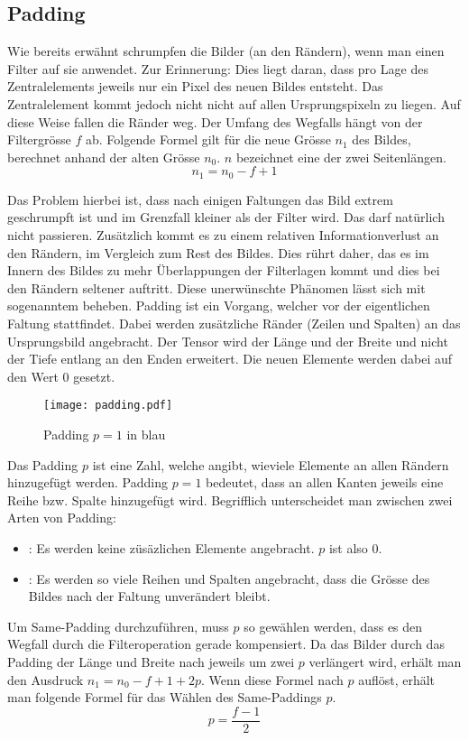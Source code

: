 \subsection{Padding}
Wie bereits erwähnt schrumpfen die Bilder (an den Rändern), wenn man einen Filter auf sie anwendet.
Zur Erinnerung: Dies liegt daran, dass pro Lage des Zentralelements jeweils nur ein Pixel
des neuen Bildes entsteht. Das Zentralelement kommt jedoch nicht nicht auf allen
Ursprungspixeln zu liegen. Auf diese Weise fallen die Ränder weg. Der Umfang des
Wegfalls hängt von der Filtergrösse $f$ ab. Folgende Formel gilt für die
neue Grösse $n_1$ des Bildes, berechnet anhand der alten Grösse $n_0$. $n$ bezeichnet
eine der zwei Seitenlängen.
\begin{equation}
  n_1 = n_0 - f + 1
\end{equation}

Das Problem hierbei ist, dass nach einigen Faltungen das Bild extrem geschrumpft
ist und im Grenzfall kleiner als der Filter wird. Das darf natürlich nicht
passieren. Zusätzlich kommt es zu einem relativen Informationverlust an den
Rändern, im Vergleich zum Rest des Bildes. Dies rührt daher,
das es im Innern des Bildes zu mehr Überlappungen der Filterlagen kommt und dies
bei den Rändern seltener auftritt.
\para{}
Diese unerwünschte Phänomen lässt sich mit sogenanntem  beheben. Padding ist ein
Vorgang, welcher vor der eigentlichen Faltung stattfindet. Dabei werden
zusätzliche Ränder (Zeilen und Spalten) an das Ursprungsbild angebracht. Der
Tensor wird der Länge und der Breite und nicht der Tiefe entlang an den
Enden erweitert. Die neuen Elemente werden dabei auf den Wert $0$ gesetzt.

\begin{figure}[h!]
  \centering
  \texttt{[image: padding.pdf]}
  \caption{Padding $p=1$ in blau}
\end{figure}

Das Padding $p$ ist eine Zahl, welche angibt, wieviele Elemente an allen Rändern
hinzugefügt werden. Padding $p = 1$ bedeutet, dass an allen Kanten jeweils eine
Reihe bzw. Spalte hinzugefügt wird.
Begrifflich unterscheidet man zwischen zwei Arten von Padding:
\begin{itemize}
\item{: Es werden keine züsäzlichen Elemente angebracht. $p$ ist also 0.}
\item{: Es werden so viele Reihen und Spalten angebracht, dass
    die Grösse des Bildes nach der Faltung unverändert bleibt.}
\end{itemize}
\para{}
Um Same-Padding durchzuführen, muss $p$ so gewählen werden, dass es den Wegfall durch
die Filteroperation gerade kompensiert. Da das Bilder durch das Padding der Länge und
Breite nach jeweils um zwei $p$ verlängert wird, erhält man den Ausdruck $n_1 =
n_0 - f + 1 + 2p$. Wenn diese Formel nach $p$ auflöst,
erhält man folgende Formel für das Wählen des Same-Paddings $p$.
\\
\begin{equation}
  p = \frac{f-1}{2}
\end{equation}

